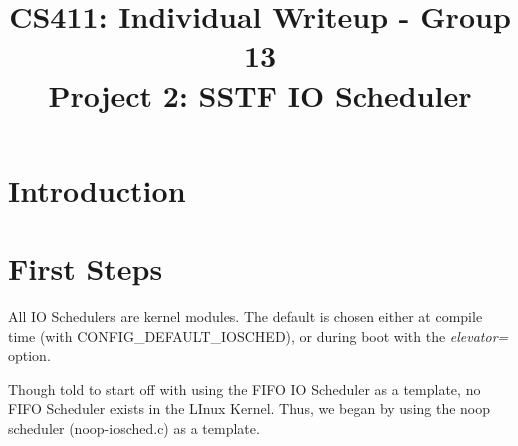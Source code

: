 \documentclass[letterpaper,10pt,titlepage]{article}
\title{CS411: Individual Writeup - Group 13\\
    Project 2: SSTF IO Scheduler}
\date{}
\author{\name}
\begin{document}
\maketitle

\tableofcontents

\section{Introduction}

\section{First Steps}

All IO Schedulers are kernel modules. The default is chosen either at
compile time (with CONFIG\_DEFAULT\_IOSCHED), or during boot with the
\emph{elevator=} option.

Though told to start off with using the FIFO IO Scheduler as a template,
no FIFO Scheduler exists in the LInux Kernel. Thus, we began by using
the noop scheduler (noop-iosched.c) as a template.
\end{document}
